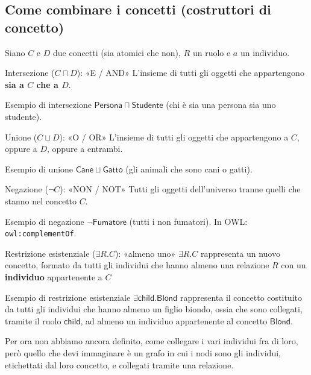 \newpage
\subsection{Come combinare i concetti (costruttori di concetto)}

Siano \(C\) e \(D\) due concetti (sia atomici che non), \(R\) un ruolo e \(a\) un individuo.

\begin{definition}{Intersezione (\(C\sqcap D\)): «E / AND»}
    L'insieme di tutti gli oggetti che appartengono \textbf{sia a \(C\)
    che a \(D\)}.
\end{definition}
\begin{observation}{Esempio di intersezione}
    \(\mathsf{Persona}\sqcap\mathsf{Studente}\) (chi è sia una persona
    sia uno studente).
\end{observation}

\begin{definition}{Unione (\(C\sqcup D\)): «O / OR»}
    L'insieme di tutti gli oggetti che appartengono a \(C\), oppure a \(D\),
    oppure a entrambi.
\end{definition}
\begin{observation}{Esempio di unione}
    \(\mathsf{Cane}\sqcup\mathsf{Gatto}\) (gli animali che sono cani o gatti).
\end{observation}

\begin{definition}{Negazione (\(\neg C\)): «NON / NOT»}
    Tutti gli oggetti dell'universo tranne quelli che stanno nel concetto \(C\).
\end{definition}
\begin{observation}{Esempio di negazione}
    \(\neg\mathsf{Fumatore}\) (tutti i non fumatori).
    In OWL: \texttt{owl:complementOf}.
\end{observation}

\begin{definition}{Restrizione esistenziale (\(\exists R.C\)): «almeno uno»}
    \(\exists R.C\) rappresenta un nuovo concetto, formato da tutti gli individui che hanno almeno una relazione $R$ con un \textbf{individuo} appartenente a $C$
\end{definition}
\begin{observation}{Esempio di restrizione esistenziale}
    \(\exists\mathsf{child}.\mathsf{Blond}\) rappresenta il concetto costituito da tutti gli individui che hanno almeno un figlio biondo, ossia che sono collegati, tramite il ruolo \(\mathsf{child}\), ad almeno un individuo appartenente al concetto \(\mathsf{Blond}\).


    Per ora non abbiamo ancora definito, come collegare i vari individui fra di loro, però quello che devi immaginare è un grafo in cui i nodi sono gli individui, etichettati dal loro concetto, e collegati tramite una relazione.
\end{observation}

